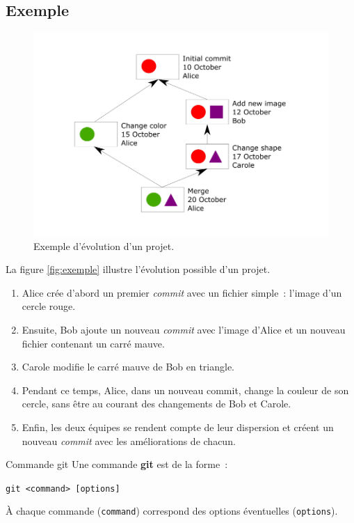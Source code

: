 \documentclass[a4paper,11pt]{style-esi/td}
\newcommand{\git}{\textbf{git }}
\begin{document}
\subsection{Exemple}

\begin{figure}[h]
	\centering
	\includegraphics[width=.9\linewidth]{img/exemple.png}
	\caption{Exemple d'évolution d'un projet.}
	\label{fig:exemple}
\end{figure}

La figure \vref{fig:exemple} illustre l’évolution possible d’un projet. 

\begin{enumerate}

	\item Alice crée d’abord un premier \textit{commit} avec un fichier simple~: 
		l’image d’un cercle rouge. 
		
	\item Ensuite, Bob ajoute un nouveau \textit{commit} avec l’image d’Alice et un 
		nouveau fichier contenant un carré mauve. 
		
	\item Carole modifie le carré mauve de Bob en triangle. 
		
	\item Pendant ce temps, Alice, dans un nouveau commit, change la couleur de 
		son cercle, sans être au courant des changements de Bob et Carole. 
		
	\item Enfin, les deux équipes se rendent compte de leur dispersion et créent 
		un nouveau \textit{commit} avec les améliorations de chacun. 

\end{enumerate}

\begin{theorie}{Commande git}
	Une commande \git est de la forme~:

	\bigskip
	\texttt{\Large git <command> [options]}
	\bigskip

	À chaque commande (\texttt{command}) correspond des options éventuelles
	(\texttt{options}).

\end{theorie}
\end{document}
